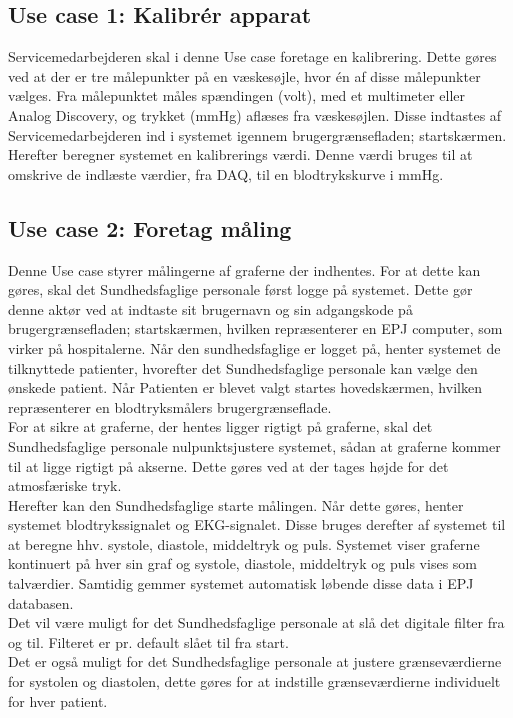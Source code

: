 \subsection{Use case 1: Kalibrér apparat}
Servicemedarbejderen skal i denne Use case foretage en kalibrering. Dette gøres ved at der er tre målepunkter på en væskesøjle, hvor én af disse målepunkter vælges. Fra målepunktet måles spændingen (volt), med et multimeter eller Analog Discovery, og trykket (mmHg) aflæses fra væskesøjlen. Disse indtastes af Servicemedarbejderen ind i systemet igennem brugergrænsefladen; startskærmen. Herefter beregner systemet en kalibrerings værdi. Denne værdi bruges til at omskrive de indlæste værdier, fra DAQ, til en blodtrykskurve i mmHg.
\subsection{Use case 2: Foretag måling}
Denne Use case styrer målingerne af graferne der indhentes. For at dette kan gøres, skal det Sundhedsfaglige personale først logge på systemet. Dette gør denne aktør ved at indtaste sit brugernavn og sin adgangskode på brugergrænsefladen; startskærmen, hvilken repræsenterer en EPJ computer, som virker på hospitalerne. Når den sundhedsfaglige er logget på, henter systemet de tilknyttede patienter, hvorefter det Sundhedsfaglige personale kan vælge den ønskede patient. Når Patienten er blevet valgt startes hovedskærmen, hvilken repræsenterer en blodtryksmålers brugergrænseflade. \\
For at sikre at graferne, der hentes ligger rigtigt på graferne, skal det Sundhedsfaglige personale nulpunktsjustere systemet, sådan at graferne kommer til at ligge rigtigt på akserne. Dette gøres ved at der tages højde for det atmosfæriske tryk.\\
Herefter kan den Sundhedsfaglige starte målingen. Når dette gøres, henter systemet blodtrykssignalet og EKG-signalet. Disse bruges derefter af systemet til at beregne hhv. systole, diastole, middeltryk og puls. Systemet viser graferne kontinuert på hver sin graf og systole, diastole, middeltryk og puls vises som talværdier. Samtidig gemmer systemet automatisk løbende disse data i EPJ databasen. \\
Det vil være muligt for det Sundhedsfaglige personale at slå det digitale filter fra og til. Filteret er pr. default slået til fra start.\\
Det er også muligt for det Sundhedsfaglige personale at justere grænseværdierne for systolen og diastolen, dette gøres for at indstille grænseværdierne individuelt for hver patient.
